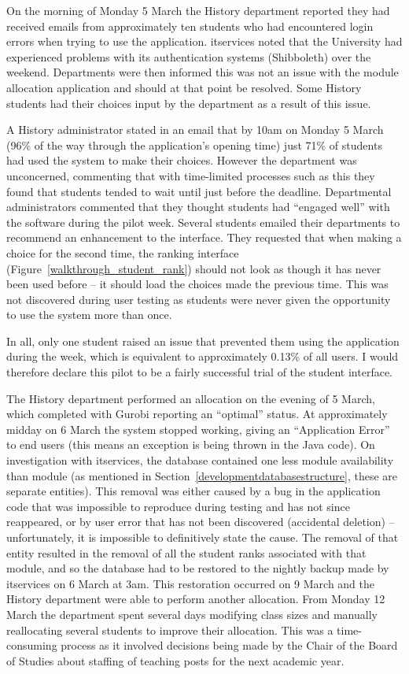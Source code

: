 On the morning of Monday 5 March the History department reported they had
received emails from approximately ten students who had encountered login
errors when trying to use the application. \gls{itservices} noted that the
University had experienced problems with its authentication systems
(Shibboleth) over the weekend. Departments were then informed this was not an
issue with the module allocation application and should at that point be
resolved. Some History students had their choices input by the department as a
result of this issue.

A History administrator stated in an email that by 10am on Monday 5 March
(96\% of the way through the application's opening time) just 71\% of students
had used the system to make their choices. However the department was
unconcerned, commenting that with time-limited processes such as this they
found that students tended to wait until just before the deadline.
Departmental administrators commented that they thought students had ``engaged
well'' with the software during the pilot week. Several students emailed their
departments to recommend an enhancement to the interface. They requested that
when making a choice for the second time, the ranking interface
(Figure~\ref{walkthrough_student_rank}) should not look as though it has never
been used before -- it should load the choices made the previous time. This
was not discovered during user testing as students were never given the
opportunity to use the system more than once.

In all, only one student raised an issue that prevented them using the
application during the week, which is equivalent to approximately 0.13\% of
all users. I would therefore declare this pilot to be a fairly successful
trial of the student interface.

The History department performed an allocation on the evening of 5 March,
which completed with Gurobi reporting an ``optimal'' status. At approximately
midday on 6 March the system stopped working, giving an ``Application Error''
to end users (this means an exception is being thrown in the Java code). On
investigation with \gls{itservices}, the database contained one less module
availability than module (as mentioned in
Section~\ref{developmentdatabasestructure}, these are separate entities). This
removal was either caused by a bug in the application code that was impossible
to reproduce during testing and has not since reappeared, or by user error
that has not been discovered (accidental deletion) -- unfortunately, it is
impossible to definitively state the cause. The removal of that entity
resulted in the removal of all the student ranks associated with that module,
and so the database had to be restored to the nightly backup made by
\gls{itservices} on 6 March at 3am. This restoration occurred on 9 March and
the History department were able to perform another allocation. From Monday 12
March the department spent several days modifying class sizes and manually
reallocating several students to improve their allocation. This was a
time-consuming process as it involved decisions being made by the Chair of the
Board of Studies about staffing of teaching posts for the next academic year.

